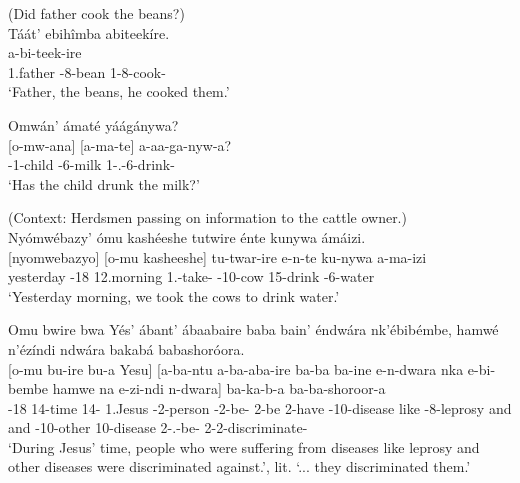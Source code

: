\documentclass[output=paper]{langscibook}
\begin{document}
\ea
\label{bkm:Ref113433194}
(Did father cook the beans?)\\
Táát’ ebihîmba abiteekíre.\\
\gll
[taata]  [e-bi-himba]  a-bi-teek-ire\\
{\db}1.father  {\db}\AUG{}-8-bean  1\SM{}-8\OM{}-cook-\PFV{}\\
\glt
`Father, the beans, he cooked them.’\\


\z

\ea
\label{bkm:Ref117001570}
Omwán’ ámaté yáágánywa?\\
\gll
{}[o-mw-ana]  [a-ma-te]  a-aa-ga-nyw-a?\\
{\db}\AUG{}-1-child  {\db}\AUG{}-6-milk  1\SM{}-\N{}.\PST{}-6\OM{}-drink-\FV{}\\
\glt
‘Has the child drunk the milk?’\\


\z

\ea
\label{bkm:Ref117001503}
(Context: Herdsmen passing on information to the cattle owner.)\\
Nyómwébazy’ ómu kashéeshe tutwire énte kunywa ámáizi.\\
\gll
{}[nyomwebazyo]  [o-mu  kasheeshe]  tu-twar-ire  e-n-te  ku-nywa     a-ma-izi \\
{\db}yesterday  {\db}\AUG{}-18  12.morning  1\PL{}.\SM{}-take-\PFV{}  \AUG{}-10-cow  15-drink   \AUG{}-6-water \\
\glt
  \glt ‘Yesterday morning, we took the cows to drink water.’\\

\z

\ea
\label{bkm:Ref117001902}
Omu bwire bwa Yés’ ábant’ ábaabaire baba bain’ éndwára nk’ébibémbe, hamwé n’ézíndi ndwára bakabá babashoróora.\\
\gll
{}[o-mu  bu-ire  bu-a  Yesu]  [a-ba-ntu  a-ba-aba-ire  ba-ba ba-ine  e-n-dwara  nka  e-bi-bembe  hamwe  na  e-zi-ndi n-dwara]  ba-ka-b-a  ba-ba-shoroor-a\\
{\db}\AUG{}-18  14-time  14-\CONN{}  1.Jesus  {\db}\AUG{}-2-person  \AUG{}-2\RM{}-be-\PFV{}  2\SM{}-be 2\SM{}-have  \AUG{}-10-disease  like  \AUG{}-8-leprosy  and  and  \AUG{}-10-other 10-disease  2\SM{}-\F.\PST{}-be-\FV{}  2\SM{}-2\OM{}-discriminate-\FV{}\\
\glt
‘During Jesus’ time, people who were suffering from diseases like leprosy and other diseases were discriminated against.’, lit. `... they discriminated them.'\\
\end{document}

